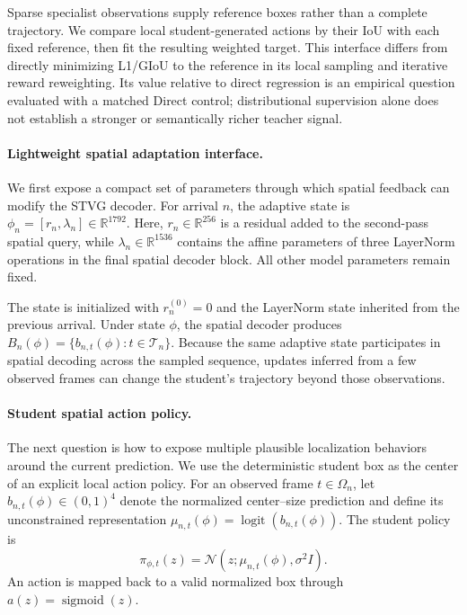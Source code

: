 \documentclass[10pt,twocolumn,letterpaper]{article}
\begin{document}
Sparse specialist observations supply reference boxes rather than a
complete trajectory. We compare local student-generated actions by their
IoU with each fixed reference, then fit the resulting weighted target.
This interface differs from directly minimizing L1/GIoU to the reference
in its local sampling and iterative reward reweighting. Its value relative
to direct regression is an empirical question evaluated with a matched
Direct control; distributional supervision alone does not establish a
stronger or semantically richer teacher signal.

\paragraph{Lightweight spatial adaptation interface.}
We first expose a compact set of parameters through which spatial feedback can
modify the STVG decoder. For arrival $n$, the adaptive state is
$\phi_n=[r_n,\lambda_n]\in\mathbb R^{1792}$.
Here, $r_n\in\mathbb R^{256}$ is a residual added to the second-pass spatial
query, while $\lambda_n\in\mathbb R^{1536}$ contains the affine parameters of
three LayerNorm operations in the final spatial decoder block.
All other model parameters remain fixed.

The state is initialized with $r_n^{(0)}=0$ and the LayerNorm state inherited
from the previous arrival. Under state $\phi$, the spatial decoder produces
$B_n(\phi)=\{b_{n,t}(\phi):t\in\mathcal T_n\}$.
Because the same adaptive state participates in spatial decoding across the
sampled sequence, updates inferred from a few observed frames can change the
student's trajectory beyond those observations.

\paragraph{Student spatial action policy.}
The next question is how to expose multiple plausible localization behaviors
around the current prediction. We use the deterministic student box as the
center of an explicit local action policy.
For an observed frame $t\in\Omega_n$, let
$b_{n,t}(\phi)\in(0,1)^4$ denote the normalized center--size prediction and
define its unconstrained representation
$\mu_{n,t}(\phi)=\operatorname{logit}(b_{n,t}(\phi))$.
The student policy is
\begin{equation}
	\pi_{\phi,t}(z)
	=
	\mathcal N
	\!\left(
	z;\mu_{n,t}(\phi),\sigma^2 I
	\right).
	\label{eq:spatial-policy}
\end{equation}
An action is mapped back to a valid normalized box through
$a(z)=\operatorname{sigmoid}(z)$.
\end{document}
